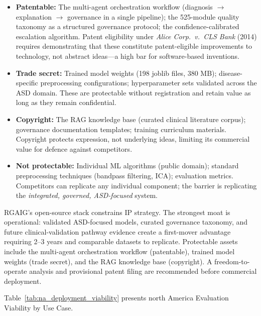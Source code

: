 \begin{itemize}
    \item \textbf{Patentable:} The multi-agent orchestration workflow (diagnosis $\to$ explanation $\to$ governance in a single pipeline); the 525-module quality taxonomy as a structured governance protocol; the confidence-calibrated escalation algorithm. Patent eligibility under \textit{Alice Corp.\ v.\ CLS Bank} (2014) requires demonstrating that these constitute patent-eligible improvements to technology, not abstract ideas---a high bar for software-based inventions.
    \item \textbf{Trade secret:} Trained model weights (198 joblib files, 380 MB); disease-specific preprocessing configurations; hyperparameter sets validated across the ASD domain. These are protectable without registration and retain value as long as they remain confidential.
    \item \textbf{Copyright:} The RAG knowledge base (curated clinical literature corpus); governance documentation templates; training curriculum materials. Copyright protects expression, not underlying ideas, limiting its commercial value for defence against competitors.
    \item \textbf{Not protectable:} Individual ML algorithms (public domain); standard preprocessing techniques (bandpass filtering, ICA); evaluation metrics. Competitors can replicate any individual component; the barrier is replicating the \textit{integrated, governed, ASD-focused} system.
\end{itemize}
\fi
\noindent RGAIG's open-source stack constrains IP strategy. The strongest moat is operational: validated ASD-focused models, curated governance taxonomy, and future clinical-validation pathway evidence create a first-mover advantage requiring 2--3 years and comparable datasets to replicate. Protectable assets include the multi-agent orchestration workflow (patentable), trained model weights (trade secret), and the RAG knowledge base (copyright). A freedom-to-operate analysis and provisional patent filing are recommended before commercial deployment.

\iffalse
\noindent Table~\ref{tab:na_deployment_viability} presents north America Evaluation Viability by Use Case.

